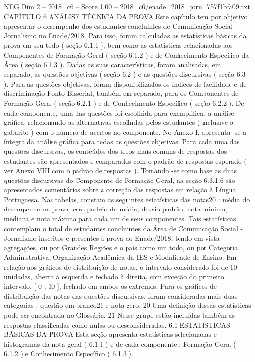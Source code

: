 \begin{textsample}{NEG Dim 2 – 2018\_c6 – Score 1.00 – 2018\_c6/enade\_2018\_jorn\_757f1bfa09.txt}  \label{ex:f2_neg_237}
CAPÍTULO 6 ANÁLISE TÉCNICA DA PROVA Este capítulo tem por objetivo apresentar o desempenho dos estudantes concluintes de Comunicação Social - Jornalismo no Enade/2018.
Para isso, foram calculadas as estatísticas básicas da prova em seu todo ( seção 6.1.1 ), bem como as estatísticas relacionadas aos Componentes de Formação Geral ( seção 6.1.2 ) e de Conhecimento Específico da Área ( seção 6.1.3 ).
Dadas as suas características, foram analisadas, em separado, as questões objetivas ( seção 6.2 ) e as questões discursivas ( seção 6.3 ).
Para as questões objetivas, foram disponibilizados os índices de facilidade e de discriminação Ponto-Bisserial, também em separado, para os Componentes de Formação Geral ( seção 6.2.1 ) e de Conhecimento Específico ( seção 6.2.2 ).
De cada componente, uma das questões foi escolhida para exemplificar a análise gráfica, relacionando as alternativas escolhidas pelos estudantes ( inclusive o gabarito ) com o número de acertos no componente.
No Anexo I, apresenta -se a íntegra da análise gráfica para todas as questões objetivas.
Para cada uma das questões discursivas, os conteúdos dos tipos mais comuns de respostas dos estudantes são apresentados e comparados com o padrão de respostas esperado ( ver Anexo VIII com o padrão de respostas ).
Tomando -se como base as duas questões discursivas do Componente de Formação Geral, na seção 6.3.1.6 são apresentados comentários sobre a correção das respostas em relação à Língua Portuguesa.
Nas tabelas, constam as seguintes estatísticas das notas20 : média do desempenho na prova, erro padrão da média, desvio padrão, nota mínima, mediana e nota máxima para cada um de seus componentes.
Tais estatísticas contemplam o total de estudantes concluintes da Área de Comunicação Social - Jornalismo inscritos e presentes à prova do Enade/2018, tendo em vista agregações, ou por Grandes Regiões e o país como um todo, ou por Categoria Administrativa, Organização Acadêmica da IES e Modalidade de Ensino.
Em relação aos gráficos de distribuição de notas, o intervalo considerado foi de 10 unidades, aberto à esquerda e fechado à direita, com exceção do primeiro intervalo, [ 0 ; 10 ], fechado em ambos os extremos.
Para os gráficos de distribuição das notas das questões discursivas, foram consideradas mais duas categorias : questão em branco21 e nota zero. 20 Uma definição dessas estatísticas pode ser encontrada no Glossário. 21 Nesse grupo estão incluídas também as respostas classificadas como nulas ou desconsideradas. 6.1 ESTATÍSTICAS BÁSICAS DA PROVA Esta seção apresenta estatísticas selecionadas e histogramas da nota geral ( 6.1.1 ) e de cada componente : Formação Geral ( 6.1.2 ) e Conhecimento Específico ( 6.1.3 ).

\end{textsample}
